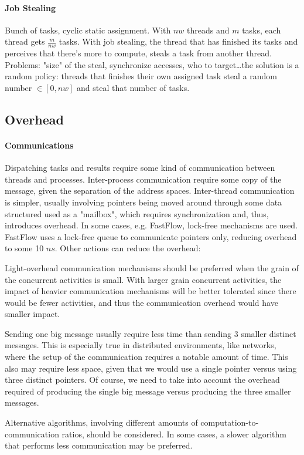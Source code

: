 \documentclass[10pt]{report}
\begin{document}
\paragraph{Job Stealing} Bunch of tasks, cyclic static assignment. With $nw$ threads and $m$ tasks, each thread gets $\frac{m}{nw}$ tasks. With job stealing, the thread that has finished its tasks and perceives that there's more to compute, steals a task from another thread. Problems: "size" of the steal, synchronize accesses, who to target\ldots the solution is a random policy: threads that finishes their own assigned task steal a random number $\in[0, nw]$ and steal that number of tasks.
\subsection{Overhead}
\paragraph{Communications}
Dispatching tasks and results require some kind of communication between threads and processes. Inter-process communication require some copy of the message, given the separation of the address spaces. Inter-thread communication is simpler, usually involving pointers being moved around through some data structured used as a "mailbox", which requires synchronization and, thus, introduces overhead. In some cases, e.g. FastFlow, lock-free mechanisms are used. FastFlow uses a lock-free queue to communicate pointers only, reducing overhead to some 10 $ns$. Other actions can reduce the overhead:
\begin{list}{}{}
	\item Light-overhead communication mechanisms should be preferred when the grain of the concurrent activities is small. With larger grain concurrent activities, the impact of heavier communication mechanisms will be better tolerated since there would be fewer activities, and thus the communication overhead would have smaller impact.
	\item Sending one big message usually require less time than sending 3 smaller distinct messages. This is especially true in distributed environments, like networks, where the setup of the communication requires a notable amount of time. This also may require less space, given that we would use a single pointer versus using three distinct pointers. Of course, we need to take into account the overhead required of producing the single big message versus producing the three smaller messages.
	\item Alternative algorithms, involving different amounts of computation-to-communication ratios, should be considered. In some cases, a slower algorithm that performs less communication may be preferred.
\end{list}
\end{document}
